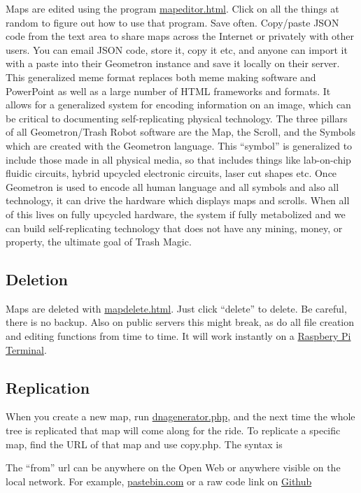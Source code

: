 Maps are edited using the program \url{mapeditor.html}. Click on all the
things at random to figure out how to use that program. Save often.
Copy/paste JSON code from the text area to share maps across the
Internet or privately with other users. You can email JSON code, store
it, copy it etc, and anyone can import it with a paste into their
Geometron instance and save it locally on their server. This generalized
meme format replaces both meme making software and PowerPoint as well as
a large number of HTML frameworks and formats. It allows for a
generalized system for encoding information on an image, which can be
critical to documenting self-replicating physical technology. The three
pillars of all Geometron/Trash Robot software are the Map, the Scroll,
and the Symbols which are created with the Geometron language. This
``symbol'' is generalized to include those made in all physical media,
so that includes things like lab-on-chip fluidic circuits, hybrid
upcycled electronic circuits, laser cut shapes etc. Once Geometron is
used to encode all human language and all symbols and also all
technology, it can drive the hardware which displays maps and scrolls.
When all of this lives on fully upcycled hardware, the system if fully
metabolized and we can build self-replicating technology that does not
have any mining, money, or property, the ultimate goal of Trash Magic.

\subsection{Deletion}\label{deletion}

Maps are deleted with \url{mapdelete.html}. Just click ``delete'' to
delete. Be careful, there is no backup. Also on public servers this
might break, as do all file creation and editing functions from time to
time. It will work instantly on a \href{scrolls/terminal}{Raspbery Pi
Terminal}.

\subsection{Replication}\label{replication}

When you create a new map, run \url{dnagenerator.php}, and the next time
the whole tree is replicated that map will come along for the ride. To
replicate a specific map, find the URL of that map and use copy.php. The
syntax is

The ``from'' url can be anywhere on the Open Web or anywhere visible on
the local network. For example,
\href{https://www.pastebin.com}{pastebin.com} or a raw code link on
\href{https://www.github.com}{Github}

